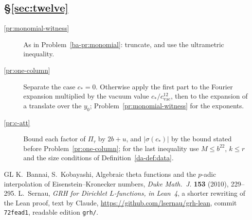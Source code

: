 \documentclass[reqno]{amsart}
\theoremstyle{definition}
\theoremstyle{plain}
\newcommand{\cvac}{c_{\mathrm{vac}}}
\begin{document}
\subsection*{\S\ref{sec:twelve}}
\begin{description}
\item[\ref{pr:monomial-witness}] As in Problem~\ref{ba-pr:monomial}: truncate, and use the ultrametric inequality.
\item[\ref{pr:one-column}] Separate the case \(c_* = 0\).  Otherwise apply the first part to the Fourier expansion multiplied by the vacuum value \(c_*/\cvac^{12}\), then to the expansion of a translate over the \(y_0\); Problem~\ref{pr:monomial-witness} for the exponents.
\item[\ref{pr:c-att}] Bound each factor of \(\Pi_\tau\) by \(2b + u\), and \(\lvert\sigma(c_*)\rvert\) by the bound stated before Problem~\ref{pr:one-column}; for the last inequality use \(M \le b^{22}\), \(k \le r\) and the size conditions of Definition~\ref{da-def:data}.
\end{description}

\begin{thebibliography}{GL}
 K.~Bannai, S.~Kobayashi, Algebraic theta functions and the \(p\)-adic interpolation of Eisenstein--Kronecker numbers, \emph{Duke Math.\ J.} \textbf{153} (2010), 229--295.
 L.~Sernau, \emph{GRH for Dirichlet \(L\)-functions, in Lean~4}, a shorter rewriting of the Lean proof, text by Claude, \url{https://github.com/lsernau/grh-lean}, commit \texttt{72fead1}, readable edition \texttt{grh/}.
\end{thebibliography}
\end{document}
